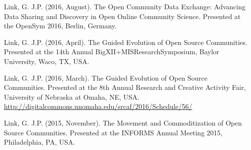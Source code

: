 \Gap
\NumberedItem{[4]}
{
Link, G. J.P. (2016, August). The Open Community Data Exchange: Advancing Data Sharing and Discovery in Open Online Community Science. Presented at the OpenSym 2016, Berlin, Germany.
}

\Gap
\NumberedItem{[3]}
{
Link, G. J.P. (2016, April). The Guided Evolution of Open Source Communities. Presented at the 14th Annual BigXII+MISResearchSymposium, Baylor University, Waco, TX, USA.
}

\Gap
\NumberedItem{[2]}
{
Link, G. J.P. (2016, March). The Guided Evolution of Open Source Communities. Presented at the 8th Annual Research and Creative Activity Fair, University of Nebraska at Omaha, NE, USA. \url{http://digitalcommons.unomaha.edu/srcaf/2016/Schedule/56/}
}

\Gap
\NumberedItem{[1]}
{
Link, G. J.P. (2015, November). The Movement and Commoditization of Open Source Communities. Presented at the INFORMS Annual Meeting 2015, Philadelphia, PA, USA.
}

\endgroup



